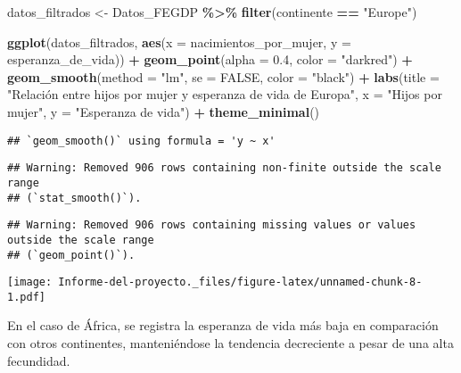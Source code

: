\documentclass[
]{article}
\newenvironment{Shaded}{\begin{snugshade}}{\end{snugshade}}
\newcommand{\AttributeTok}[1]{\textcolor[rgb]{0.13,0.29,0.53}{#1}}
\newcommand{\ConstantTok}[1]{\textcolor[rgb]{0.56,0.35,0.01}{#1}}
\newcommand{\FloatTok}[1]{\textcolor[rgb]{0.00,0.00,0.81}{#1}}
\newcommand{\FunctionTok}[1]{\textcolor[rgb]{0.13,0.29,0.53}{\textbf{#1}}}
\newcommand{\NormalTok}[1]{#1}
\newcommand{\OtherTok}[1]{\textcolor[rgb]{0.56,0.35,0.01}{#1}}
\newcommand{\SpecialCharTok}[1]{\textcolor[rgb]{0.81,0.36,0.00}{\textbf{#1}}}
\newcommand{\StringTok}[1]{\textcolor[rgb]{0.31,0.60,0.02}{#1}}
\begin{document}
\begin{Shaded}
\begin{Highlighting}[]
\NormalTok{datos\_filtrados }\OtherTok{\textless{}{-}}\NormalTok{ Datos\_FEGDP }\SpecialCharTok{\%\textgreater{}\%}
  \FunctionTok{filter}\NormalTok{(continente }\SpecialCharTok{==} \StringTok{"Europe"}\NormalTok{)}
  
\FunctionTok{ggplot}\NormalTok{(datos\_filtrados, }\FunctionTok{aes}\NormalTok{(}\AttributeTok{x =}\NormalTok{ nacimientos\_por\_mujer, }\AttributeTok{y =}\NormalTok{ esperanza\_de\_vida)) }\SpecialCharTok{+}
  \FunctionTok{geom\_point}\NormalTok{(}\AttributeTok{alpha =} \FloatTok{0.4}\NormalTok{, }\AttributeTok{color =} \StringTok{"darkred"}\NormalTok{) }\SpecialCharTok{+}
  \FunctionTok{geom\_smooth}\NormalTok{(}\AttributeTok{method =} \StringTok{"lm"}\NormalTok{, }\AttributeTok{se =} \ConstantTok{FALSE}\NormalTok{, }\AttributeTok{color =} \StringTok{"black"}\NormalTok{) }\SpecialCharTok{+}
  \FunctionTok{labs}\NormalTok{(}\AttributeTok{title =} \StringTok{"Relación entre hijos por mujer }
\StringTok{       y esperanza de vida de Europa"}\NormalTok{, }\AttributeTok{x =} \StringTok{"Hijos por mujer"}\NormalTok{, }\AttributeTok{y =} \StringTok{"Esperanza de vida"}\NormalTok{) }\SpecialCharTok{+}
  \FunctionTok{theme\_minimal}\NormalTok{()}
\end{Highlighting}
\end{Shaded}

\begin{verbatim}
## `geom_smooth()` using formula = 'y ~ x'
\end{verbatim}

\begin{verbatim}
## Warning: Removed 906 rows containing non-finite outside the scale range
## (`stat_smooth()`).
\end{verbatim}

\begin{verbatim}
## Warning: Removed 906 rows containing missing values or values outside the scale range
## (`geom_point()`).
\end{verbatim}

\texttt{[image: Informe-del-proyecto.\_files/figure-latex/unnamed-chunk-8-1.pdf]}

En el caso de África, se registra la esperanza de vida más baja en
comparación con otros continentes, manteniéndose la tendencia
decreciente a pesar de una alta fecundidad.
\end{document}
